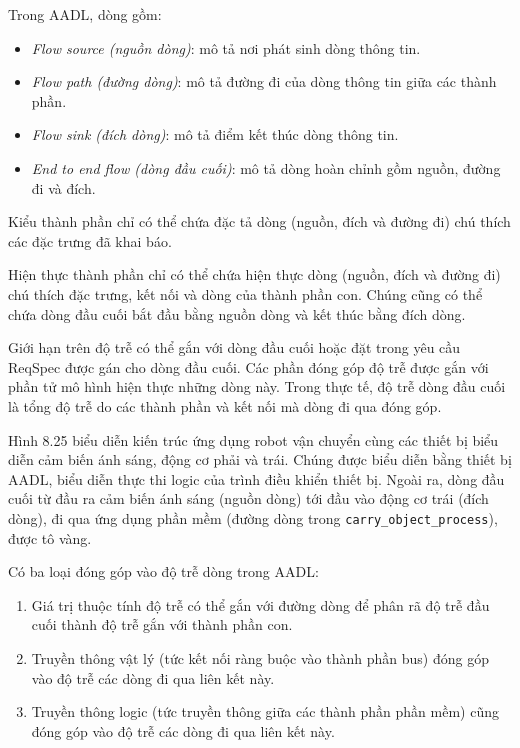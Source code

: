 Trong AADL, dòng gồm:
\begin{itemize}
\item \emph{Flow source (nguồn dòng)}: mô tả nơi phát sinh dòng thông tin.
\item \emph{Flow path (đường dòng)}: mô tả đường đi của dòng thông tin giữa các thành phần.
\item \emph{Flow sink (đích dòng)}: mô tả điểm kết thúc dòng thông tin.
\item \emph{End to end flow (dòng đầu cuối)}: mô tả dòng hoàn chỉnh gồm nguồn, đường đi và đích.
\end{itemize}

Kiểu thành phần chỉ có thể chứa đặc tả dòng (nguồn, đích và đường đi) chú thích các đặc trưng đã khai báo.

Hiện thực thành phần chỉ có thể chứa hiện thực dòng (nguồn, đích và đường đi) chú thích đặc trưng, kết nối và dòng của thành phần con. Chúng cũng có thể chứa dòng đầu cuối bắt đầu bằng nguồn dòng và kết thúc bằng đích dòng.

Giới hạn trên độ trễ có thể gắn với dòng đầu cuối hoặc đặt trong yêu cầu ReqSpec được gán cho dòng đầu cuối. Các phần đóng góp độ trễ được gắn với phần tử mô hình hiện thực những dòng này. Trong thực tế, độ trễ dòng đầu cuối là tổng độ trễ do các thành phần và kết nối mà dòng đi qua đóng góp.

Hình 8.25 biểu diễn kiến trúc ứng dụng robot vận chuyển cùng các thiết bị biểu diễn cảm biến ánh sáng, động cơ phải và trái. Chúng được biểu diễn bằng thiết bị AADL, biểu diễn thực thi logic của trình điều khiển thiết bị. Ngoài ra, dòng đầu cuối từ đầu ra cảm biến ánh sáng (nguồn dòng) tới đầu vào động cơ trái (đích dòng), đi qua ứng dụng phần mềm (đường dòng trong \texttt{carry\_object\_process}), được tô vàng.

Có ba loại đóng góp vào độ trễ dòng trong AADL:
\begin{enumerate}
\item Giá trị thuộc tính độ trễ có thể gắn với đường dòng để phân rã độ trễ đầu cuối thành độ trễ gắn với thành phần con.
\item Truyền thông vật lý (tức kết nối ràng buộc vào thành phần bus) đóng góp vào độ trễ các dòng đi qua liên kết này.
\item Truyền thông logic (tức truyền thông giữa các thành phần phần mềm) cũng đóng góp vào độ trễ các dòng đi qua liên kết này.
\end{enumerate}

